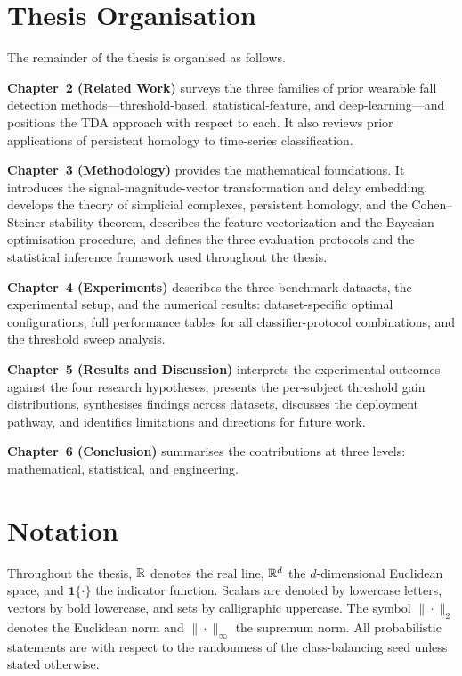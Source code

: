 \section{Thesis Organisation}
\label{subsec:organisation}

The remainder of the thesis is organised as follows.

\textbf{Chapter~2 (Related Work)} surveys the three families of prior wearable fall
detection methods---threshold-based, statistical-feature, and deep-learning---and
positions the TDA approach with respect to each.  It also reviews prior applications
of persistent homology to time-series classification.

\textbf{Chapter~3 (Methodology)} provides the mathematical foundations.  It
introduces the signal-magnitude-vector transformation and delay embedding, develops
the theory of simplicial complexes, persistent homology, and the Cohen--Steiner
stability theorem, describes the feature vectorization and the Bayesian optimisation
procedure, and defines the three evaluation protocols and the statistical inference
framework used throughout the thesis.

\textbf{Chapter~4 (Experiments)} describes the three benchmark datasets, the
experimental setup, and the numerical results: dataset-specific optimal configurations,
full performance tables for all classifier-protocol combinations, and the threshold
sweep analysis.

\textbf{Chapter~5 (Results and Discussion)} interprets the experimental outcomes
against the four research hypotheses, presents the per-subject threshold gain
distributions, synthesises findings across datasets, discusses the deployment
pathway, and identifies limitations and directions for future work.

\textbf{Chapter~6 (Conclusion)} summarises the contributions at three levels:
mathematical, statistical, and engineering.

\section*{Notation}

Throughout the thesis, $\mathbb{R}$ denotes the real line, $\mathbb{R}^d$ the $d$-dimensional
Euclidean space, and $\mathbf{1}\{\cdot\}$ the indicator function.  Scalars are
denoted by lowercase letters, vectors by bold lowercase, and sets by calligraphic
uppercase.  The symbol $\|\cdot\|_2$ denotes the Euclidean norm and
$\|\cdot\|_\infty$ the supremum norm.  All probabilistic statements are with
respect to the randomness of the class-balancing seed unless stated otherwise.

